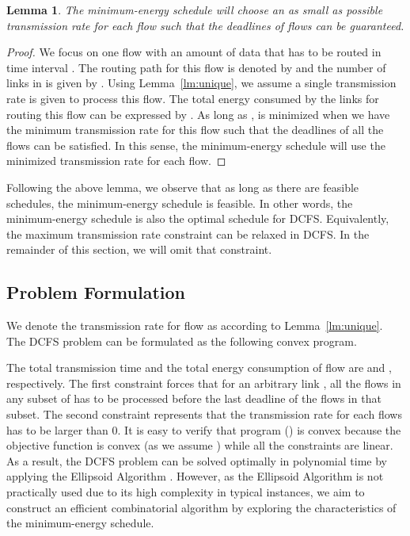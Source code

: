 \documentclass[10pt, conference, compsocconf]{IEEEtran}
\newtheorem{lemma}{Lemma}
\begin{document}
\begin{lemma}
\label{lm:minimum}
The minimum-energy schedule will choose an as small as possible transmission rate for each flow such that the deadlines of flows can be guaranteed.
\end{lemma}
\begin{proof}
We focus on one flow with an amount  of data that has to be routed in time interval . The routing path for this flow is denoted by  and the number of links in  is given by . Using Lemma~\ref{lm:unique}, we assume a single transmission rate  is given to process this flow. The total energy consumed by the links for routing this flow can be expressed by . As long as ,  is minimized when we have the minimum transmission rate  for this flow such that the deadlines of all the flows can be satisfied. In this sense, the minimum-energy schedule will use the minimized transmission rate for each flow.
\end{proof}

Following the above lemma, we observe that as long as there are feasible schedules, the minimum-energy schedule is feasible. In other words, the minimum-energy schedule is also the optimal schedule for DCFS. Equivalently, the maximum transmission rate constraint  can be relaxed in DCFS. In the remainder of this section, we will omit that constraint.

\subsection{Problem Formulation}
We denote the transmission rate for flow  as  according to Lemma~\ref{lm:unique}.
The DCFS problem can be formulated as the following convex program.

The total transmission time and the total energy consumption of flow  are  and , respectively. The first constraint forces that for an arbitrary link , all the flows in any subset of  has to be processed before the last deadline of the flows in that subset. The second constraint represents that the transmission rate for each flows has to be larger than 0. It is easy to verify that program () is convex because the objective function is convex (as we assume ) while all the constraints are linear. As a result, the DCFS problem can be solved optimally in polynomial time by applying the Ellipsoid Algorithm \cite{Nesterov-Ellipsoid-1994}. However, as the Ellipsoid Algorithm is not practically used due to its high complexity in typical instances, we aim to construct an efficient combinatorial algorithm by exploring the characteristics of the minimum-energy schedule.
\end{document}
